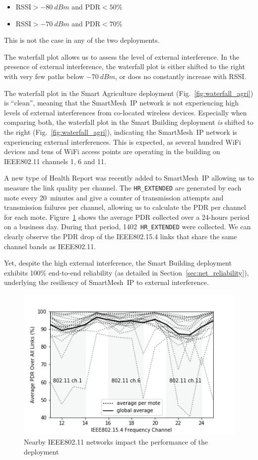 \documentclass{elsarticle}
\newcommand{\smip}                {SmartMesh~IP\xspace}
\newcommand{\building}            {Smart Building\xspace}
\newcommand{\agri}                {Smart Agriculture\xspace}
\newcommand{\HREXTENDED}          {{\tt HR\_EXTENDED}\xspace}
\begin{document}
\begin{itemize}
    \item RSSI$>-80~dBm$ and PDR$<50$\%
    \item RSSI$>-70~dBm$ and PDR$<70$\%
\end{itemize}

This is not the case in any of the two deployments.


The waterfall plot allows us to assess the level of external interference.
In the presence of external interference, the waterfall plot is either shifted to the right with very few paths below $-70~dBm$, or does no constantly increase with RSSI.

The waterfall plot in the \agri deployment (Fig.~\ref{fig:waterfall_agri}) is ``clean'', meaning that the \smip network is not experiencing high levels of external interferences from co-located wireless devices.
Especially when comparing both, the waterfall plot in the \building deployment \textit{is} shifted to the right (Fig.~\ref{fig:waterfall_agri}), indicating the \smip network is experiencing external interferences.
This is expected, as several hundred WiFi devices and tens of WiFi access points are operating in the building on IEEE802.11 channels 1, 6 and 11.

A new type of Health Report was recently added to \smip allowing us to measure the link quality per channel.
The \HREXTENDED are generated by each mote every 20~minutes and give a counter of transmission attempts and transmission failures per channel, allowing us to calculate the PDR per channel for each mote.
Figure~\ref{fig:heatmap} shows the average PDR collected over a 24-hours period on a business day.
During that period, 1402~\HREXTENDED were collected.
We can clearly observe the PDR drop of the IEEE802.15.4 links that share the same channel bands as IEEE802.11.

Yet, despite the high external interference, the \building deployment exhibits 100\% end-to-end reliability (as detailed in Section~\ref{sec:net_reliability}), underlying the resiliency of \smip to external interference.

\begin{figure}  
    \includegraphics[width=\columnwidth]{heatmap.png}
    \caption{Nearby IEEE802.11 networks impact the performance of the deployment}
    \label{fig:heatmap}
\end{figure}
\end{document}
